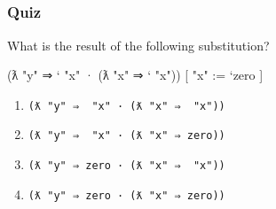 \begin{fence}
\begin{code}
\<%
\\
\>[0]\AgdaSymbol{\AgdaUnderscore{}}\AgdaSpace{}%
\AgdaSymbol{=}\AgdaSpace{}%
\<%
\\
%
\\[\AgdaEmptyExtraSkip]%
\>[0]\AgdaFunction{\AgdaUnderscore{}}\AgdaSpace{}%
\AgdaSymbol{:}\AgdaSpace{}%
\AgdaSymbol{(}\AgdaSpace{}%
\AgdaSpace{}%
\AgdaSpace{}%
\AgdaSpace{}%
\AgdaSymbol{)}\AgdaSpace{}%
\AgdaOperator{\AgdaFunction{[}}\AgdaSpace{}%
\AgdaSpace{}%
\AgdaOperator{\AgdaFunction{:=}}\AgdaSpace{}%
\AgdaSpace{}%
\AgdaOperator{\AgdaFunction{]}}\AgdaSpace{}%
\AgdaSpace{}%
\AgdaSpace{}%
\AgdaSpace{}%
\AgdaSpace{}%
\AgdaSpace{}%
\<%
\\
\>[0]\AgdaSymbol{\AgdaUnderscore{}}\AgdaSpace{}%
\AgdaSymbol{=}\AgdaSpace{}%
\<%
\end{code}
\end{fence}

\hypertarget{quiz}{%
\subsubsection{Quiz}\label{quiz}}

What is the result of the following substitution?

\begin{myDisplay}
(ƛ "y" ⇒ ` "x" · (ƛ "x" ⇒ ` "x")) [ "x" := `zero ]
\end{myDisplay}

\begin{enumerate}
\def\labelenumi{\arabic{enumi}.}
\tightlist
\item
  \texttt{(ƛ\ "y"\ ⇒\ \textasciigrave{}\ "x"\ ·\ (ƛ\ "x"\ ⇒\ \textasciigrave{}\ "x"))}
\item
  \texttt{(ƛ\ "y"\ ⇒\ \textasciigrave{}\ "x"\ ·\ (ƛ\ "x"\ ⇒\ \textasciigrave{}zero))}
\item
  \texttt{(ƛ\ "y"\ ⇒\ \textasciigrave{}zero\ ·\ (ƛ\ "x"\ ⇒\ \textasciigrave{}\ "x"))}
\item
  \texttt{(ƛ\ "y"\ ⇒\ \textasciigrave{}zero\ ·\ (ƛ\ "x"\ ⇒\ \textasciigrave{}zero))}
\end{enumerate}

